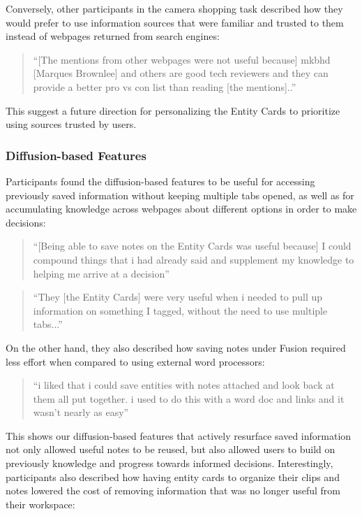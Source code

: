 \noindent Conversely, other participants in the camera shopping task described how they would prefer to use information sources that were familiar and trusted to them instead of webpages returned from search engines:

\begin{quote}
``[The mentions from other webpages were not useful because] mkbhd [Marques Brownlee] and others are good tech reviewers and they can provide a better pro vs con list than reading [the mentions]..''
\end{quote}

\noindent This suggest a future direction for personalizing the Entity Cards to prioritize using sources trusted by users.

\subsubsection{\textbf{Diffusion-based Features}}

Participants found the diffusion-based features to be useful for accessing previously saved information without keeping multiple tabs opened, as well as for accumulating knowledge across webpages about different options in order to make decisions: 

\begin{quote}
``[Being able to save notes on the Entity Cards was useful because] I could compound things that i had already said and supplement my knowledge to helping me arrive at a decision''
\end{quote}

\begin{quote}
``They [the Entity Cards] were very useful when i needed to pull up information on something I tagged, without the need to use multiple tabs...'' 
\end{quote}

\noindent On the other hand, they also described how saving notes under Fusion required less effort when compared to using external word processors:

\begin{quote}
``i liked that i could save entities with notes attached and look back at them all put together. i used to do this with a word doc and links and it wasn't nearly as easy''
\end{quote}

\noindent This shows our diffusion-based features that actively resurface saved information not only allowed useful notes to be reused, but also allowed users to build on previously knowledge and progress towards informed decisions. Interestingly, participants also described how having entity cards to organize their clips and notes lowered the cost of removing information that was no longer useful from their workspace:

